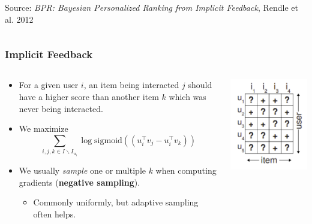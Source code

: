 \documentclass[11pt]{beamer}
\begin{document}
\begin{frame}
\begin{columns}
\begin{column}{0.5\textwidth}
\begin{center}
					{\tiny Source: \textit{BPR: Bayesian Personalized Ranking from Implicit Feedback}, Rendle et al. 2012}
				\end{center}
			\end{column}
		\end{columns}
	\end{frame}

	\begin{frame}
		\frametitle{Implicit Feedback}
		\begin{columns}
			\begin{column}{0.6\textwidth}
				\begin{itemize}
					\item<1-> For a given user $i$, an item being interacted $j$ should have a higher score than another item $k$ which was never being interacted.
					\item<2-> We maximize
					$$
					\sum_{i,j,k\in I \backslash I_{u_i}}
					\log \mathrm{sigmoid}(\left(u_i^\top v_j - u_i^\top v_k\right))
					$$
					\item<3-> We usually \emph{sample} one or multiple $k$ when computing gradients (\textbf{negative sampling}).
					\begin{itemize}
						\item Commonly uniformly, but adaptive sampling often helps.
					\end{itemize}
				\end{itemize}
			\end{column}
			\begin{column}{0.4\textwidth}
				\begin{center}
					\centering
					\includegraphics[width=\textwidth]{images/implicit.png}
					

\end{center}
\end{column}
\end{columns}
\end{frame}
\end{document}

